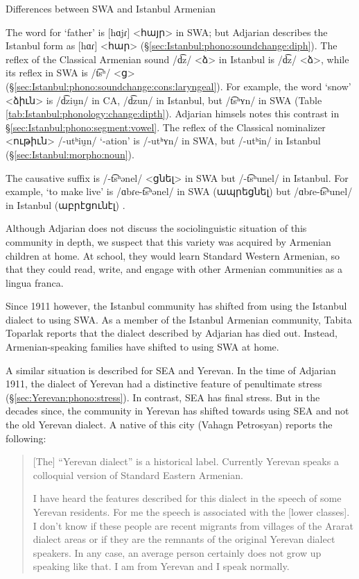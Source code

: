 \begin{exe}
	\ex Differences between SWA and Istanbul Armenian
	\begin{xlist}
		\ex The word for `father' is [hɑjɾ] <հայր> in SWA; but Adjarian describes the Istanbul form as [hɑɾ] <հար> (\S\ref{sec:Istanbul:phono:soundchange:diph}).
		\ex The reflex of the Classical Armenian sound /d͡z/ <ձ> in Istanbul is /d͡z/ <ձ>, while its reflex in SWA is /t͡sʰ/ <ց> (\S\ref{sec:Istanbul:phono:soundchange:cons:laryngeal}). For example, the word `snow' <ձիւն> is /d͡ziu̯n/ in CA, /d͡zun/ in Istanbul, but /t͡sʰʏn/ in SWA (Table \ref{tab:Istanbul:phonology:change:dipth}). Adjarian himsels notes this contrast in \S\ref{sec:Istanbul:phono:segment:vowel}. 
		\ex The reflex of the Classical nominalizer <ութիւն> /-utʰiu̯n/ `-ation' is /-utʰʏn/ in SWA, but /-utʰin/ in Istanbul (\S\ref{sec:Istanbul:morpho:noun}). 
		\item The causative suffix is /-t͡sʰənel/ <ցնել> in SWA but /-t͡sʰunel/ in Istanbul. For example, `to make live' is /ɑbɾe-t͡sʰənel/ in SWA (ապրեցնել) but /ɑbɾe-t͡sʰunel/ in Istanbul (աբրէցունէլ) \citep[140]{Adjarian-1941-IstanbulDialect}. 
	\end{xlist}
\end{exe}






Although Adjarian does not discuss the sociolinguistic situation of this community in depth, we suspect that this variety was acquired by Armenian children at home. At school, they would learn Standard Western Armenian, so that they could read, write, and engage with other Armenian communities as a lingua franca. 

Since 1911 however, the Istanbul community has shifted from using the Istanbul dialect to using SWA. As a member of the Istanbul Armenian community, Tabita Toparlak reports that the dialect described by Adjarian has died out. Instead, Armenian-speaking families have shifted to using SWA at home. 




A similar situation is described for SEA and Yerevan. In the time of Adjarian 1911, the dialect of Yerevan had a distinctive feature of penultimate stress (\S\ref{sec:Yerevan:phono:stress}). In contrast, SEA has final stress. But in the decades since, the community in Yerevan has shifted towards using SEA and not the old Yerevan dialect. A native of this city (Vahagn Petrosyan) reports the following:

\begin{quote}
	[The] ``Yerevan dialect'' is a historical label. Currently Yerevan speaks a colloquial version of Standard Eastern Armenian.
	
	I have heard the features described for this dialect in the speech of some Yerevan residents. For me the speech is associated with the [lower classes]. I don't know if these people are recent migrants from villages of the Ararat dialect areas or if they are the remnants of the original Yerevan dialect speakers. In any case, an average person certainly does not grow up speaking like that. I am from Yerevan and I speak normally. 
\end{quote}

